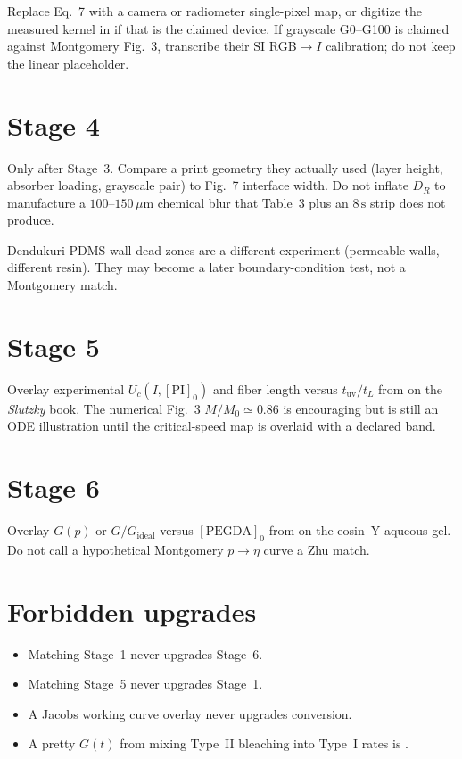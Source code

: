 Replace Eq.~7 with a camera or radiometer single-pixel map, or digitize the measured kernel in \citet{Meenakshisundaram2020} if that is the claimed device.
If grayscale G0--G100 is claimed against Montgomery Fig.~3, transcribe their SI RGB$\to I$ calibration; do not keep the linear placeholder.

\section{Stage 4}

Only after Stage~3.
Compare a print geometry they actually used (layer height, absorber loading, grayscale pair) to Fig.~7 interface width.
Do not inflate $D_R$ to manufacture a $100$--$150\,\mu\mathrm{m}$ chemical blur that Table~3 plus an $8\,\mathrm{s}$ strip does not produce.

Dendukuri PDMS-wall dead zones are a different experiment (permeable walls, different resin).
They may become a later boundary-condition test, not a Montgomery match.

\section{Stage 5}

Overlay experimental $U_c(I,[\mathrm{PI}]_0)$ and fiber length versus $t_{\mathrm{uv}}/t_L$ from \citet{Slutzky2019} on the \emph{Slutzky} book.
The numerical Fig.~3 $M/M_0\simeq0.86$ is encouraging but is still an ODE illustration until the critical-speed map is overlaid with a declared band.

\section{Stage 6}

Overlay $G(p)$ or $G/G_{\mathrm{ideal}}$ versus $[\mathrm{PEGDA}]_0$ from \citet{Zhu2020} on the eosin~Y aqueous gel.
Do not call a hypothetical Montgomery $p\to\eta$ curve a Zhu match.

\section{Forbidden upgrades}

\begin{itemize}
  \item Matching Stage~1 never upgrades Stage~6.
  \item Matching Stage~5 never upgrades Stage~1.
  \item A Jacobs working curve overlay never upgrades conversion.
  \item A pretty $G(t)$ from mixing Type~II bleaching into Type~I rates is \taginvalid.
\end{itemize}

